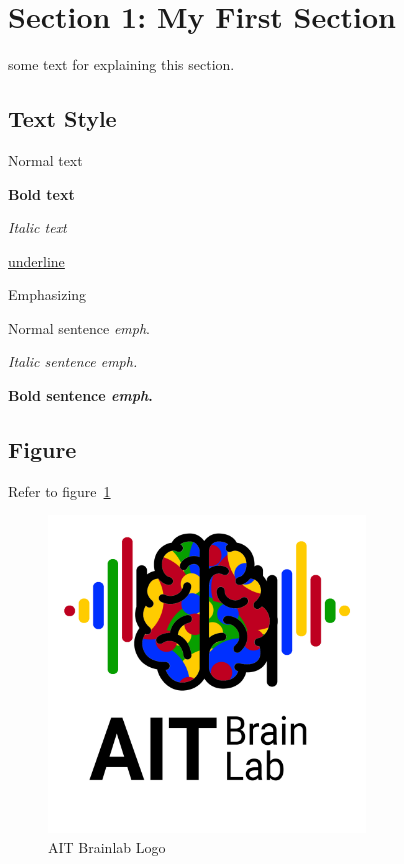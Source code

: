 
\section{Section 1: My First Section}

some text for explaining this section.

\subsection{Text Style}

Normal text

\textbf{Bold text}

\textit{Italic text}

\underline{underline}

Emphasizing

Normal sentence \emph{emph}.

\textit{Italic sentence \emph{emph}.}

\textbf{Bold sentence \emph{emph}.}

\subsection{Figure}

Refer to figure~\ref{fig:brainlab-logo}

\begin{figure}[ht!]
    \centering
    \includegraphics[width=0.75\textwidth]{../4_figure/figures/bci-logo.png}
    \caption{\label{fig:brainlab-logo}AIT Brainlab Logo}
\end{figure}


